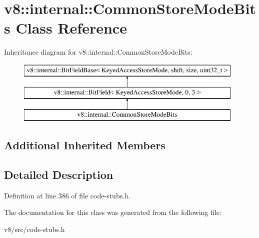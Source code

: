 \hypertarget{classv8_1_1internal_1_1CommonStoreModeBits}{}\section{v8\+:\+:internal\+:\+:Common\+Store\+Mode\+Bits Class Reference}
\label{classv8_1_1internal_1_1CommonStoreModeBits}
Inheritance diagram for v8\+:\+:internal\+:\+:Common\+Store\+Mode\+Bits\+:\begin{figure}[H]
\begin{center}
\leavevmode
\includegraphics[height=3.000000cm]{classv8_1_1internal_1_1CommonStoreModeBits}
\end{center}
\end{figure}
\subsection*{Additional Inherited Members}


\subsection{Detailed Description}


Definition at line 386 of file code-\/stubs.\+h.



The documentation for this class was generated from the following file\+:\begin{DoxyCompactItemize}
\item 
v8/src/code-\/stubs.\+h\end{DoxyCompactItemize}
